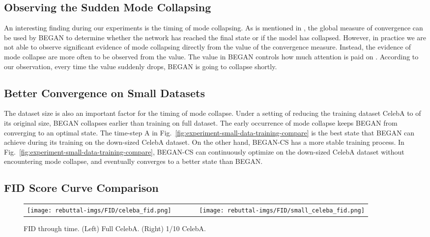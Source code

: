 \documentclass[runningheads]{llncs}
\begin{document}
    \subsection{Observing the Sudden Mode Collapsing}
    \label{subsection:SuddenModeCollapse}
    
    An interesting finding during our experiments is the timing of mode collapsing.
    As is mentioned in \cite{BEGAN}, the global measure of convergence can be used by BEGAN to determine whether the network has reached the final state or if the model has collapsed. However, in practice we are not able to observe significant evidence of mode collapsing directly from the value of the convergence measure. Instead, the evidence of mode collapse are more often to be observed from the  value. The  value in BEGAN controls how much attention is paid on . According to our observation, every time the  value suddenly drops, BEGAN is going to collapse shortly.
    
    
    \subsection{Better Convergence on Small Datasets}
    \label{subsection:better-convergence-on-small-dataset}
    
    The dataset size is also an important factor for the timing of mode collapse. Under a setting of reducing the training dataset CelebA to  of its original size, BEGAN collapses earlier than training on full dataset. The early occurrence of mode collapse keeps BEGAN from converging to an optimal state. The time-step {\sf A} in Fig.~\ref{fig:experiment-small-data-training-compare} is the best state that BEGAN can achieve during its training on the down-sized CelebA dataset. On the other hand, BEGAN-CS has a more stable training process. In Fig.~\ref{fig:experiment-small-data-training-compare}, BEGAN-CS can continuously optimize on the  down-sized CelebA dataset without encountering  mode collapse, and eventually converges to a better state than BEGAN.
    
    \subsection{FID Score Curve Comparison}
    
    \newlength{\oldintextsep}
    \setlength{\oldintextsep}{\intextsep}
    \setlength\intextsep{0pt}
    
    \begin{wrapfigure}[13]{r}{0.65\linewidth}
        \captionsetup{width=0.8\linewidth}
        \centering
        \begin{tabular}{C{0.5\linewidth}C{0.5\linewidth}}
             \texttt{[image: rebuttal-imgs/FID/celeba\_fid.png]} &
             \texttt{[image: rebuttal-imgs/FID/small\_celeba\_fid.png]}
        \end{tabular}
        \caption{FID through time. (Left) Full CelebA. (Right) 1/10 CelebA.}
        \label{Figure:FID_scores}
    \end{wrapfigure}
\end{document}
